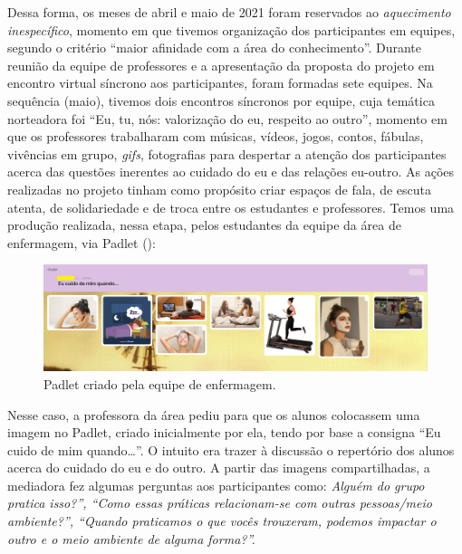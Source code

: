 Dessa forma, os meses de abril e maio de 2021 foram reservados ao \textit{aquecimento inespecífico}, momento em que tivemos organização dos participantes em equipes, segundo o critério “maior afinidade com a área do conhecimento”. Durante reunião da equipe de professores e a apresentação da proposta do projeto em encontro virtual síncrono aos participantes, foram formadas sete equipes. Na sequência (maio), tivemos dois encontros síncronos por equipe, cuja temática norteadora foi “Eu, tu, nós: valorização do eu, respeito ao outro”, momento em que os professores trabalharam com músicas, vídeos, jogos, contos, fábulas, vivências em grupo, \textit{gifs}, fotografias para despertar a atenção dos participantes acerca das questões inerentes ao cuidado do eu e das relações eu-outro. As ações realizadas no projeto tinham como propósito criar espaços de fala, de escuta atenta, de solidariedade e de troca entre os estudantes e professores. Temos uma produção realizada, nessa etapa, pelos estudantes da equipe da área de enfermagem, via Padlet ():

\begin{figure}[htbp]
\centering
\begin{minipage}{.9\textwidth}
\includegraphics[width=\textwidth]{figure01.png}
\caption{Padlet criado pela equipe de enfermagem.}\label{fig-01}
\end{minipage}
\end{figure}
 
Nesse caso, a professora da área pediu para que os alunos colocassem uma imagem no Padlet, criado inicialmente por ela, tendo por base a consigna “Eu cuido de mim quando…”. O intuito era trazer à discussão o repertório dos alunos acerca do cuidado do eu e do outro. A partir das imagens compartilhadas, a mediadora fez algumas perguntas aos participantes como: {\textquotedbl}\textit{Alguém do grupo pratica isso?”, “Como essas práticas relacionam-se com outras pessoas/meio ambiente?”, “Quando praticamos o que vocês trouxeram, podemos impactar o outro e o meio ambiente de alguma forma?”.}

